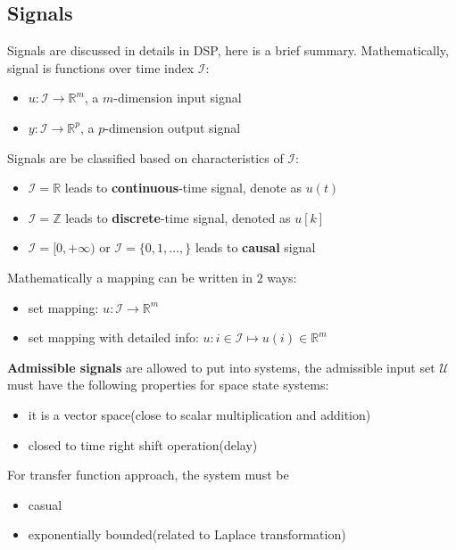 \documentclass[10pt,a4paper,oneside]{article}
\begin{document}
\subsection{Signals}
Signals are discussed in details in DSP, here is a brief summary. Mathematically, signal is functions over time index $\mathcal{I}$:
\begin{itemize}
	\item $u: \mathcal{I} \rightarrow \mathbb{R}^m$, a $m$-dimension input signal
	\item $y: \mathcal{I} \rightarrow \mathbb{R}^p$, a $p$-dimension output signal
\end{itemize}
Signals are be classified based on characteristics of $\mathcal{I}$:
\begin{itemize}
	\item $\mathcal{I} = \mathbb{R}$ leads to \textbf{continuous}-time signal, denote as $u(t)$
	\item $\mathcal{I} = \mathbb{Z}$ leads to \textbf{discrete}-time signal, denoted as $u[k]$
	\item $\mathcal{I}=[0, +\infty)$ or $\mathcal{I}=\{0, 1, \dots,\}$ leads to \textbf{causal} signal
\end{itemize}
Mathematically a mapping can be written in $2$ ways:
\begin{itemize}
	\item set mapping: $u: \mathcal{I} \rightarrow \mathbb{R}^m$
	\item set mapping with detailed info: $u: i \in \mathcal{I} \mapsto u(i) \in \mathbb{R}^m$
\end{itemize}
\textbf{Admissible signals} are allowed to put into systems, the admissible input set $\mathcal{U}$ must have the following properties for space state systems:
\begin{itemize}
	\item it is a vector space(close to scalar multiplication and addition)
	\item closed to time right shift operation(delay)
\end{itemize}
For transfer function approach, the system must be
\begin{itemize}
	\item casual
	\item exponentially bounded(related to Laplace transformation)
\end{itemize} 
\end{document}
